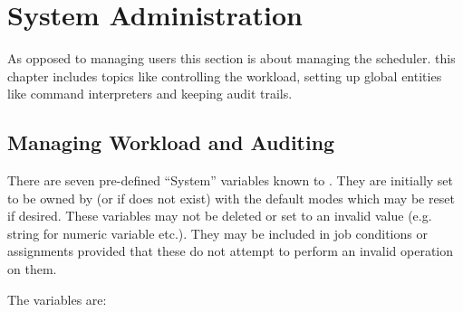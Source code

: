 \chapter{System Administration}
\label{chp:system-administration}
As opposed to managing users this section is about managing the scheduler. this chapter includes topics like controlling the workload, setting up global entities like command interpreters and keeping audit trails.

\section{Managing Workload and Auditing}
There are seven pre-defined ``System'' variables known to \ProductName{}. They are initially set to be owned by
\batchuser{} (or  if \batchuser{} does not exist) with the default modes which
may be reset if desired. These variables may not be deleted or set to an invalid value (e.g. string for numeric variable etc.). They may be
included in job conditions or assignments provided that these do not attempt to perform an invalid operation on them.

The variables are:

